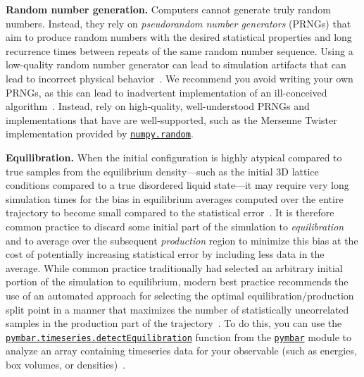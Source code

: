 \documentclass[aip,jcp,preprint,superscriptaddress,floatfix]{revtex4-1}
\begin{document}
\textbf{Random number generation.} 
Computers cannot generate truly random numbers.
Instead, they rely on \emph{pseudorandom number generators} (PRNGs) that aim to produce random numbers with the desired statistical properties and long recurrence times between repeats of the same random number sequence.
Using a low-quality random number generator can lead to simulation artifacts that can lead to incorrect physical behavior~\cite{Ferrenberg.PRL.69.3382.1992,Cerutti.JCTC.4.1669.2008}.
We recommend you avoid writing your own PRNGs, as this can lead to inadvertent implementation of an ill-conceived algorithm~\cite{RANDU}.
Instead, rely on high-quality, well-understood PRNGs and implementations that have are well-supported, such as the Mersenne Twister~\cite{Mersenne.Twister,Matsumoto.ACMTransModelComputSimul.8.3.1998} implementation provided by \href{https://docs.scipy.org/doc/numpy/reference/routines.random.html}{\tt numpy.random}.

\textbf{Equilibration.} 
When the initial configuration is highly atypical compared to true samples from the equilibrium density---such as the initial 3D lattice conditions compared to a true disordered liquid state---it may require very long simulation times for the bias in equilibrium averages computed over the entire trajectory to become small compared to the statistical error~\cite{Chodera.JCTC.12.1799.2016}.
It is therefore common practice to discard some initial part of the simulation to \emph{equilibration} and to average over the subsequent \emph{production} region to minimize this bias at the cost of potentially increasing statistical error by including less data in the average.
While common practice traditionally had selected an arbitrary initial portion of the simulation to equilibrium, modern best practice recommends the use of an automated approach for selecting the optimal equilibration/production split point in a manner that maximizes the number of statistically uncorrelated samples in the production part of the trajectory~\cite{Chodera.JCTC.12.1799.2016}.
To do this, you can use the \href{http://pymbar.readthedocs.io/en/latest/timeseries.html#automatically-identifying-the-equilibrated-production-region}{\tt pymbar.timeseries.detectEquilibration} function from the \href{http://pymbar.org/}{\tt pymbar} module to analyze an array containing timeseries data for your observable (such as energies, box volumes, or densities)~\cite{Chodera.JCTC.12.1799.2016}.
\end{document}
